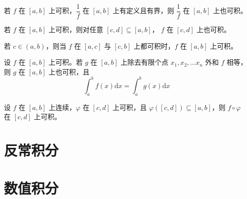 \begin{corollary}
    若 $f$ 在 $[a,b]$ 上可积，$\dfrac{1}{f}$ 在 $[a,b]$ 上有定义且有界，则 $\dfrac{1}{f}$ 在 $[a,b]$ 上也可积。
\end{corollary}

\begin{corollary}
    若 $f$ 在 $[a,b]$ 上可积，则对任意 $[c,d] \subseteq [a,b]$， $f$ 在 $[c,d]$ 上也可积。
\end{corollary}

\begin{corollary}
    若 $c \in (a,b)$，则当 $f$ 在 $[a,c]$ 与 $[c,b]$ 上都可积时，$f$ 在 $[a,b]$ 上可积。
\end{corollary}

\begin{corollary}
    设 $f$ 在 $[a,b]$ 上可积。若 $g$ 在 $[a,b]$ 上除去有限个点 $x_1,x_2, \ldots x_n$ 外和 $f$ 相等，则 $g$ 在 $[a,b]$ 上也可积，且
    \[\int_{a}^{b}f(x)\mathrm{d}x = \int_{a}^{b}g(x)\mathrm{d}x\]
\end{corollary}

\begin{corollary}
    设 $f$ 在 $[a,b]$ 上连续，$\varphi$ 在 $[c,d]$ 上可积，且 $\varphi([c,d]) \subseteq [a,b]$，则 $f\circ\varphi$ 在 $[c,d]$ 上可积。
\end{corollary}


\section{反常积分}






\section{数值积分}






